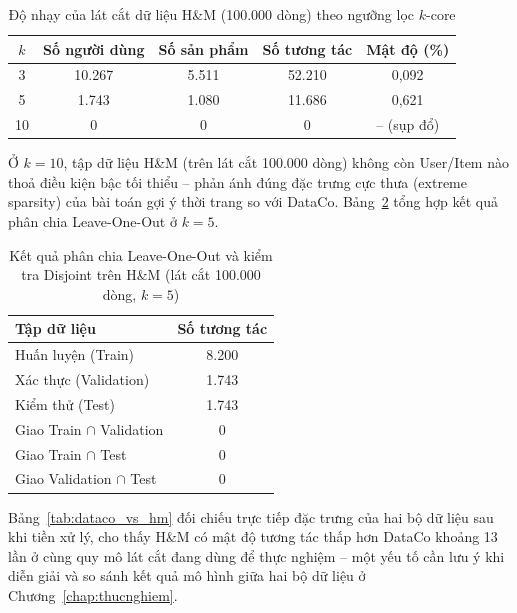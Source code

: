 \begin{table}[htbp]
    \centering
    \caption{Độ nhạy của lát cắt dữ liệu H\&M (100.000 dòng) theo ngưỡng lọc $k$-core}
    \label{tab:kcore_hm}
    \begin{tabular}{|c|c|c|c|c|}
        \hline
        \textbf{$k$} & \textbf{Số người dùng} & \textbf{Số sản phẩm} & \textbf{Số tương tác} & \textbf{Mật độ (\%)} \\
        \hline
        3 & 10.267 & 5.511 & 52.210 & 0,092 \\
        \hline
        5 & 1.743 & 1.080 & 11.686 & 0,621 \\
        \hline
        10 & 0 & 0 & 0 & -- (sụp đổ) \\
        \hline
    \end{tabular}
\end{table}

Ở $k=10$, tập dữ liệu H\&M (trên lát cắt 100.000 dòng) không còn User/Item nào thoả điều kiện bậc tối thiểu -- phản ánh đúng đặc trưng cực thưa (extreme sparsity) của bài toán gợi ý thời trang so với DataCo. Bảng~\ref{tab:split_hm} tổng hợp kết quả phân chia Leave-One-Out ở $k=5$.

\begin{table}[htbp]
    \centering
    \caption{Kết quả phân chia Leave-One-Out và kiểm tra Disjoint trên H\&M (lát cắt 100.000 dòng, $k=5$)}
    \label{tab:split_hm}
    \begin{tabular}{|l|c|}
        \hline
        \textbf{Tập dữ liệu} & \textbf{Số tương tác} \\
        \hline
        Huấn luyện (Train) & 8.200 \\
        \hline
        Xác thực (Validation) & 1.743 \\
        \hline
        Kiểm thử (Test) & 1.743 \\
        \hline
        Giao Train $\cap$ Validation & 0 \\
        \hline
        Giao Train $\cap$ Test & 0 \\
        \hline
        Giao Validation $\cap$ Test & 0 \\
        \hline
    \end{tabular}
\end{table}

Bảng~\ref{tab:dataco_vs_hm} đối chiếu trực tiếp đặc trưng của hai bộ dữ liệu sau khi tiền xử lý, cho thấy H\&M có mật độ tương tác thấp hơn DataCo khoảng 13 lần ở cùng quy mô lát cắt đang dùng để thực nghiệm -- một yếu tố cần lưu ý khi diễn giải và so sánh kết quả mô hình giữa hai bộ dữ liệu ở Chương~\ref{chap:thucnghiem}.

